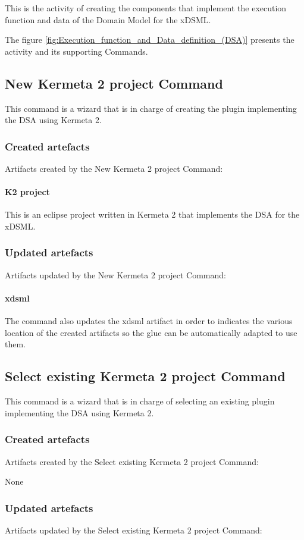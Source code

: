 \documentclass{gemoc} %
\begin{document}
This is the activity of creating the components that implement the execution function and data of the Domain Model for the xDSML.

The figure \ref{fig:Execution_function_and_Data_definition_(DSA)} presents the activity and its supporting Commands.

\subsection{New Kermeta 2 project Command}
This command is a wizard that is in charge of creating the plugin implementing the DSA using Kermeta 2.
\subsubsection{Created artefacts}
Artifacts created by the New Kermeta 2 project Command:
\paragraph{K2 project} 
This is an eclipse project written in Kermeta 2 that implements the DSA for the xDSML.
\subsubsection{Updated artefacts}
Artifacts updated by the New Kermeta 2 project Command:
\paragraph{xdsml} 
The command also updates the xdsml artifact in order to indicates the various location of the created artifacts so the glue can be automatically adapted to use them.

\subsection{Select existing Kermeta 2 project Command}
This command is a wizard that is in charge of selecting an existing plugin implementing the DSA using Kermeta 2.
\subsubsection{Created artefacts}
Artifacts created by the Select existing Kermeta 2 project Command:

	None
\subsubsection{Updated artefacts}
Artifacts updated by the Select existing Kermeta 2 project Command:
\end{document}
